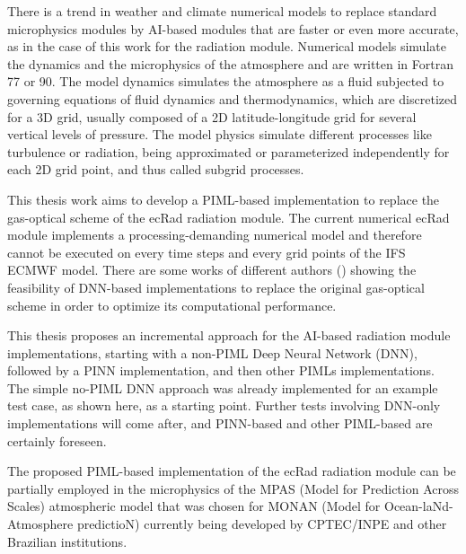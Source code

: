 There is a trend in weather and climate numerical models to replace standard microphysics modules by AI-based modules that are faster or even more accurate, as in the case of this work for the radiation module. Numerical models simulate the dynamics and the microphysics of the atmosphere and are written in Fortran 77 or 90. The model dynamics simulates the atmosphere as a fluid subjected to governing equations of fluid dynamics and thermodynamics, which are discretized for a 3D grid, usually composed of a 2D latitude-longitude grid for several vertical levels of pressure. The model physics simulate different processes like turbulence or radiation, being approximated or parameterized independently for each 2D grid point, and thus called subgrid processes.

This thesis work aims to develop a PIML-based implementation to replace the gas-optical scheme of the ecRad radiation module. The current numerical ecRad module implements a processing-demanding numerical model and therefore cannot be executed on every time steps and every grid points of the IFS ECMWF model. There are some works of different authors (\cite{Curcic2019,Krasnopolsky2008,Krasnopolsky2013,Ukkonen2020,Ukkonen2023,Veerman2021}) showing the feasibility of DNN-based implementations to replace the original gas-optical scheme in order to optimize its computational performance.

This thesis proposes an incremental approach for the AI-based radiation module implementations, starting with a non-PIML Deep Neural Network (DNN), followed by a PINN implementation, and then other PIMLs implementations. The simple no-PIML DNN approach was already implemented for an example test case, as shown here, as a starting point. Further tests involving DNN-only implementations will come after, and PINN-based and other PIML-based are certainly foreseen.

The proposed PIML-based implementation of the ecRad radiation module can be partially employed in the microphysics of the MPAS (Model for Prediction Across Scales) atmospheric model that was chosen for MONAN (Model for Ocean-laNd-Atmosphere predictioN) currently being developed by CPTEC/INPE and other Brazilian institutions. 
